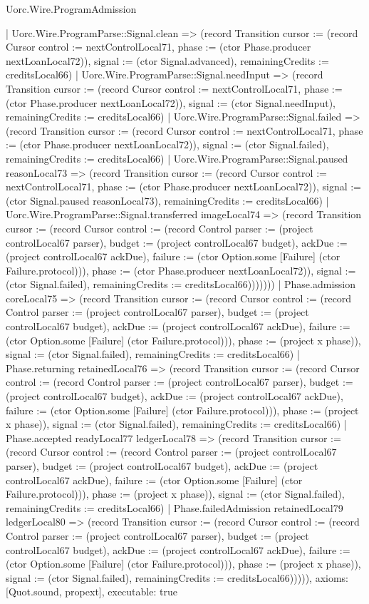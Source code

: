 \begin{lexlean}{Uorc.Wire.ProgramAdmission}
\begin{semanticmodule}
{        | Uorc.Wire.ProgramParse::Signal.clean => (record Transition {cursor := (record Cursor {control := nextControlLocal71, phase := (ctor Phase.producer nextLoanLocal72)}), signal := (ctor Signal.advanced), remainingCredits := creditsLocal66})
        | Uorc.Wire.ProgramParse::Signal.needInput => (record Transition {cursor := (record Cursor {control := nextControlLocal71, phase := (ctor Phase.producer nextLoanLocal72)}), signal := (ctor Signal.needInput), remainingCredits := creditsLocal66})
        | Uorc.Wire.ProgramParse::Signal.failed => (record Transition {cursor := (record Cursor {control := nextControlLocal71, phase := (ctor Phase.producer nextLoanLocal72)}), signal := (ctor Signal.failed), remainingCredits := creditsLocal66})
        | Uorc.Wire.ProgramParse::Signal.paused reasonLocal73 => (record Transition {cursor := (record Cursor {control := nextControlLocal71, phase := (ctor Phase.producer nextLoanLocal72)}), signal := (ctor Signal.paused reasonLocal73), remainingCredits := creditsLocal66})
        | Uorc.Wire.ProgramParse::Signal.transferred imageLocal74 => (record Transition {cursor := (record Cursor {control := (record Control {parser := (project controlLocal67 parser), budget := (project controlLocal67 budget), ackDue := (project controlLocal67 ackDue), failure := (ctor Option.some [Failure] (ctor Failure.protocol))}), phase := (ctor Phase.producer nextLoanLocal72)}), signal := (ctor Signal.failed), remainingCredits := creditsLocal66})))))))
      | Phase.admission coreLocal75 => (record Transition {cursor := (record Cursor {control := (record Control {parser := (project controlLocal67 parser), budget := (project controlLocal67 budget), ackDue := (project controlLocal67 ackDue), failure := (ctor Option.some [Failure] (ctor Failure.protocol))}), phase := (project x phase)}), signal := (ctor Signal.failed), remainingCredits := creditsLocal66})
      | Phase.returning retainedLocal76 => (record Transition {cursor := (record Cursor {control := (record Control {parser := (project controlLocal67 parser), budget := (project controlLocal67 budget), ackDue := (project controlLocal67 ackDue), failure := (ctor Option.some [Failure] (ctor Failure.protocol))}), phase := (project x phase)}), signal := (ctor Signal.failed), remainingCredits := creditsLocal66})
      | Phase.accepted readyLocal77 ledgerLocal78 => (record Transition {cursor := (record Cursor {control := (record Control {parser := (project controlLocal67 parser), budget := (project controlLocal67 budget), ackDue := (project controlLocal67 ackDue), failure := (ctor Option.some [Failure] (ctor Failure.protocol))}), phase := (project x phase)}), signal := (ctor Signal.failed), remainingCredits := creditsLocal66})
      | Phase.failedAdmission retainedLocal79 ledgerLocal80 => (record Transition {cursor := (record Cursor {control := (record Control {parser := (project controlLocal67 parser), budget := (project controlLocal67 budget), ackDue := (project controlLocal67 ackDue), failure := (ctor Option.some [Failure] (ctor Failure.protocol))}), phase := (project x phase)}), signal := (ctor Signal.failed), remainingCredits := creditsLocal66}))))),
  axioms: [Quot.sound, propext],
  executable: true
}


\end{semanticmodule}
\end{lexlean}
